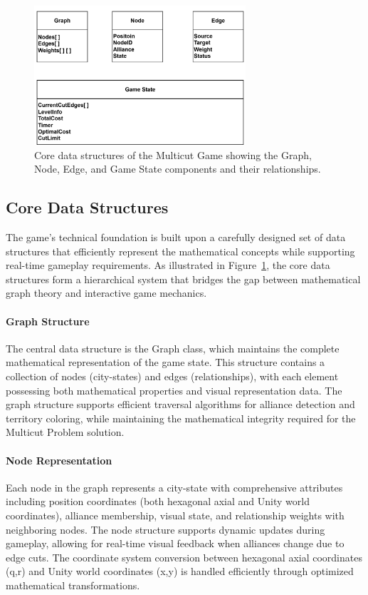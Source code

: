 \documentclass[english]{tudscrreprt}
\begin{document}
\begin{figure}[h]
\centering
\includegraphics[width=0.7\textwidth]{figures/data_structures.png}
\caption{Core data structures of the Multicut Game showing the Graph, Node, Edge, and Game State components and their relationships.}
\label{fig:data_structures}
\end{figure}

\subsection{Core Data Structures}
The game's technical foundation is built upon a carefully designed set of data structures that efficiently represent the mathematical concepts while supporting real-time gameplay requirements. As illustrated in Figure~\ref{fig:data_structures}, the core data structures form a hierarchical system that bridges the gap between mathematical graph theory and interactive game mechanics.

\paragraph{Graph Structure}
The central data structure is the Graph class, which maintains the complete mathematical representation of the game state. This structure contains a collection of nodes (city-states) and edges (relationships), with each element possessing both mathematical properties and visual representation data. The graph structure supports efficient traversal algorithms for alliance detection and territory coloring, while maintaining the mathematical integrity required for the Multicut Problem solution.

\paragraph{Node Representation}
Each node in the graph represents a city-state with comprehensive attributes including position coordinates (both hexagonal axial and Unity world coordinates), alliance membership, visual state, and relationship weights with neighboring nodes. The node structure supports dynamic updates during gameplay, allowing for real-time visual feedback when alliances change due to edge cuts. The coordinate system conversion between hexagonal axial coordinates (q,r) and Unity world coordinates (x,y) is handled efficiently through optimized mathematical transformations.
\end{document}
